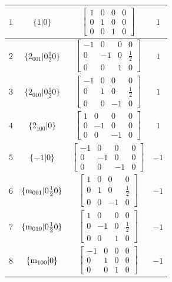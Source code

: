 \documentclass[fleqn,8pt]{jsarticle}
\begin{document}
\begin{longtable}{cccc}
$ 1 $ & $ \{1|0\} $ & $ \begin{bmatrix} 1 & 0 & 0 & 0 \\ 0 & 1 & 0 & 0 \\ 0 & 0 & 1 & 0 \end{bmatrix} $ & $ 1 $ \\ \hline
$ 2 $ & $ \{2{}_{001}|0 \frac{1}{2} 0\} $ & $ \begin{bmatrix} -1 & 0 & 0 & 0 \\ 0 & -1 & 0 & \frac{1}{2} \\ 0 & 0 & 1 & 0 \end{bmatrix} $ & $ 1 $ \\ \hline
$ 3 $ & $ \{2{}_{010}|0 \frac{1}{2} 0\} $ & $ \begin{bmatrix} -1 & 0 & 0 & 0 \\ 0 & 1 & 0 & \frac{1}{2} \\ 0 & 0 & -1 & 0 \end{bmatrix} $ & $ 1 $ \\ \hline
$ 4 $ & $ \{2{}_{100}|0\} $ & $ \begin{bmatrix} 1 & 0 & 0 & 0 \\ 0 & -1 & 0 & 0 \\ 0 & 0 & -1 & 0 \end{bmatrix} $ & $ 1 $ \\ \hline
$ 5 $ & $ \{-1|0\} $ & $ \begin{bmatrix} -1 & 0 & 0 & 0 \\ 0 & -1 & 0 & 0 \\ 0 & 0 & -1 & 0 \end{bmatrix} $ & $ -1 $ \\ \hline
$ 6 $ & $ \{{\rm m}_{001}|0 \frac{1}{2} 0\} $ & $ \begin{bmatrix} 1 & 0 & 0 & 0 \\ 0 & 1 & 0 & \frac{1}{2} \\ 0 & 0 & -1 & 0 \end{bmatrix} $ & $ -1 $ \\ \hline
$ 7 $ & $ \{{\rm m}_{010}|0 \frac{1}{2} 0\} $ & $ \begin{bmatrix} 1 & 0 & 0 & 0 \\ 0 & -1 & 0 & \frac{1}{2} \\ 0 & 0 & 1 & 0 \end{bmatrix} $ & $ -1 $ \\ \hline
$ 8 $ & $ \{{\rm m}_{100}|0\} $ & $ \begin{bmatrix} -1 & 0 & 0 & 0 \\ 0 & 1 & 0 & 0 \\ 0 & 0 & 1 & 0 \end{bmatrix} $ & $ -1 $ \\
\end{longtable}
\end{document}
